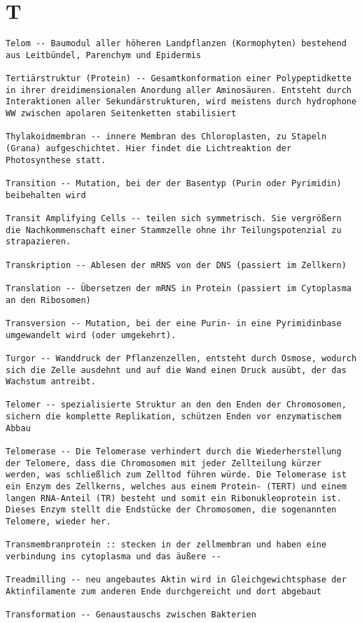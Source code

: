 \documentclass{article}
\begin{document}
\section{T}
\begin{verbatim}
Telom -- Baumodul aller höheren Landpflanzen (Kormophyten) bestehend aus Leitbündel, Parenchym und Epidermis

Tertiärstruktur (Protein) -- Gesamtkonformation einer Polypeptidkette in ihrer dreidimensionalen Anordung aller Aminosäuren. Entsteht durch Interaktionen aller Sekundärstrukturen, wird meistens durch hydrophone WW zwischen apolaren Seitenketten stabilisiert 

Thylakoidmembran -- innere Membran des Chloroplasten, zu Stapeln (Grana) aufgeschichtet. Hier findet die Lichtreaktion der Photosynthese statt.

Transition -- Mutation, bei der der Basentyp (Purin oder Pyrimidin) beibehalten wird

Transit Amplifying Cells -- teilen sich symmetrisch. Sie vergrößern die Nachkommenschaft einer Stammzelle ohne ihr Teilungspotenzial zu strapazieren.

Transkription -- Ablesen der mRNS von der DNS (passiert im Zellkern)

Translation -- Übersetzen der mRNS in Protein (passiert im Cytoplasma an den Ribosomen)

Transversion -- Mutation, bei der eine Purin- in eine Pyrimidinbase umgewandelt wird (oder umgekehrt).

Turgor -- Wanddruck der Pflanzenzellen, entsteht durch Osmose, wodurch sich die Zelle ausdehnt und auf die Wand einen Druck ausübt, der das Wachstum antreibt.

Telomer -- spezialisierte Struktur an den den Enden der Chromosomen, sichern die komplette Replikation, schützen Enden vor enzymatischem Abbau

Telomerase -- Die Telomerase verhindert durch die Wiederherstellung der Telomere, dass die Chromosomen mit jeder Zellteilung kürzer werden, was schließlich zum Zelltod führen würde. Die Telomerase ist ein Enzym des Zellkerns, welches aus einem Protein- (TERT) und einem langen RNA-Anteil (TR) besteht und somit ein Ribonukleoprotein ist. Dieses Enzym stellt die Endstücke der Chromosomen, die sogenannten Telomere, wieder her.

Transmembranprotein :: stecken in der zellmembran und haben eine verbindung ins cytoplasma und das äußere -- 

Treadmilling -- neu angebautes Aktin wird in Gleichgewichtsphase der Aktinfilamente zum anderen Ende durchgereicht und dort abgebaut

Transformation -- Genaustauschs zwischen Bakterien

\end{verbatim}
\newpage
\end{document}
